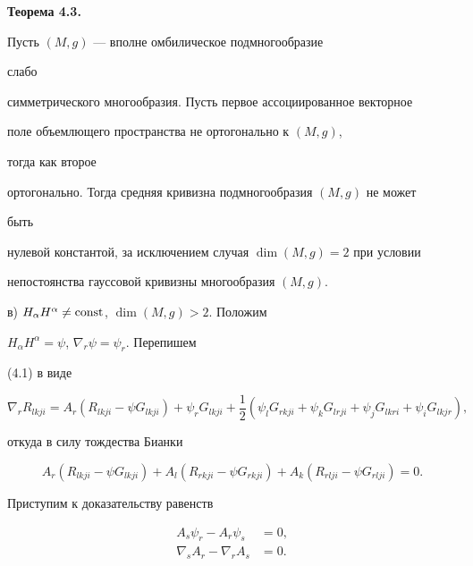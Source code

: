 \medskip





{\bf Теорема 4.3.} {\it


Пусть $(M,g)$ --- вполне омбилическое подмногообразие


слабо


симметрического многообразия. Пусть первое ассоциированное векторное


поле объемлющего пространства не ортогонально к $(M,g)$,


тогда как второе


ортогонально. Тогда средняя кривизна подмногообразия $(M,g)$ не может


быть


нулевой константой, за исключением случая $\dim(M,g)=2$ при условии


непостоянства гауссовой кривизны многообразия $(M,g)$.


}


\medskip





в) $H_\alpha H^\alpha\ne\operatorname{const}$, $\dim(M,g)>2$. Положим


$H_\alpha H^\alpha=\psi$, $\nabla_r\psi=\psi_r$. Перепишем


(4.1) в виде


\begin{equation}


\nabla_r R_{lkji}=A_r(R_{lkji}-\psi G_{lkji})+


\psi_rG_{lkji}+\frac{1}{2}(\psi_lG_{rkji}+


\psi_kG_{lrji}+\psi_jG_{lkri}+\psi_i


G_{lkjr}),\tag{4.8}


\end{equation}


откуда в силу тождества Бианки


\begin{equation}


A_r(R_{lkji}-\psi G_{lkji})+A_l(R_{rkji}-\psi


G_{rkji})+A_k(R_{rlji}-\psi G_{rlji})=0.\tag{4.9}


\end{equation}





Приступим к доказательству равенств


\begin{align}


A_s\psi_r-A_r\psi_s&=0,\tag{4.10} \\


\nabla_s A_r-\nabla_r A_s&=0.\tag{4.11}


\end{align}



